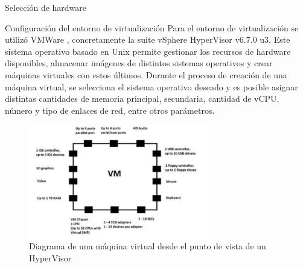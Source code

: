 \begin{section}{Selección de hardware}
        \begin{subsection}{Configuración del entorno de virtualización}
        Para el entorno de virtualización se utilizó VMWare \cite{vmware}, concretamente la suite vSphere HyperVisor v6.7.0 u3. Este sistema operativo basado en Unix permite gestionar los recursos de hardware disponibles, almacenar imágenes de distintos sistemas operativos y crear máquinas virtuales con estos últimos. Durante el proceso de creación de una máquina virtual, se selecciona el sistema operativo deseado y es posible asignar distintas cantidades de memoria principal, secundaria, cantidad de vCPU, número y tipo de enlaces de red, entre otros parámetros. \par
         \begin{figure}[H]
          \centering
           \includegraphics[width=0.7\textwidth]{./iteracion_1_imagenes/figura_34_diagrama_VM.png}
            \caption{ Diagrama de una máquina virtual desde el punto de vista de un HyperVisor\cite{vmware}}
            \label{fig:maquina_virtual}
        \end{figure}
        \end{subsection}
        

\end{section}
